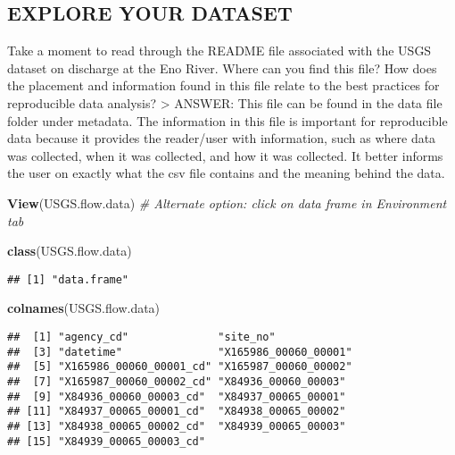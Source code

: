\documentclass[]{article}
\newenvironment{Shaded}{\begin{snugshade}}{\end{snugshade}}
\newcommand{\CommentTok}[1]{\textcolor[rgb]{0.56,0.35,0.01}{\textit{#1}}}
\newcommand{\KeywordTok}[1]{\textcolor[rgb]{0.13,0.29,0.53}{\textbf{#1}}}
\newcommand{\NormalTok}[1]{#1}
\begin{document}
\hypertarget{explore-your-dataset}{%
\subsection{EXPLORE YOUR DATASET}\label{explore-your-dataset}}

Take a moment to read through the README file associated with the USGS
dataset on discharge at the Eno River. Where can you find this file? How
does the placement and information found in this file relate to the best
practices for reproducible data analysis? \textgreater{} ANSWER: This
file can be found in the data file folder under metadata. The
information in this file is important for reproducible data because it
provides the reader/user with information, such as where data was
collected, when it was collected, and how it was collected. It better
informs the user on exactly what the csv file contains and the meaning
behind the data.

\begin{Shaded}
\begin{Highlighting}[]
\KeywordTok{View}\NormalTok{(USGS.flow.data)}
\CommentTok{# Alternate option: click on data frame in Environment tab}

\KeywordTok{class}\NormalTok{(USGS.flow.data)}
\end{Highlighting}
\end{Shaded}

\begin{verbatim}
## [1] "data.frame"
\end{verbatim}

\begin{Shaded}
\begin{Highlighting}[]
\KeywordTok{colnames}\NormalTok{(USGS.flow.data)}
\end{Highlighting}
\end{Shaded}

\begin{verbatim}
##  [1] "agency_cd"              "site_no"               
##  [3] "datetime"               "X165986_00060_00001"   
##  [5] "X165986_00060_00001_cd" "X165987_00060_00002"   
##  [7] "X165987_00060_00002_cd" "X84936_00060_00003"    
##  [9] "X84936_00060_00003_cd"  "X84937_00065_00001"    
## [11] "X84937_00065_00001_cd"  "X84938_00065_00002"    
## [13] "X84938_00065_00002_cd"  "X84939_00065_00003"    
## [15] "X84939_00065_00003_cd"
\end{verbatim}
\end{document}
